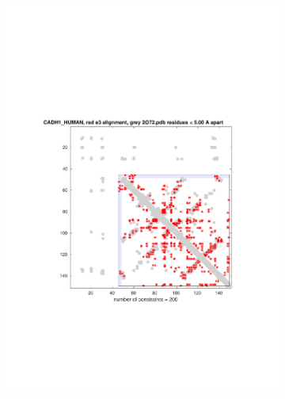 \documentclass[11pt]{article}\usepackage[]{graphicx}\usepackage[]{color}
\theoremstyle{plain}
\begin{document}
\begin{multicols*}{2}
\begin{figure}[p]
\begin{subfigure}[b]{.49\textwidth}
      \includegraphics[width=\textwidth, trim= 2cm 7cm 2cm 0cm, clip]{../figures/CADH1_HUMAN_e3_n2_m40_FPplot}
      \caption{ }
      \label{fig:human_fig3}
    \end{subfigure}~
      \begin{subfigure}[b]{.5\textwidth}

\end{subfigure}
\end{figure}
\end{multicols*}
\end{document}
